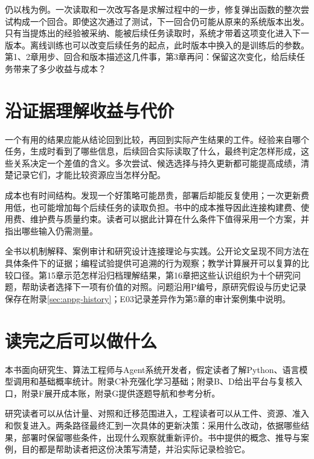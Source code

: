 仍以栈为例。一次读取和一次改写各是求解过程中的一步，修复弹出函数的整次尝试构成一个回合。即使这次通过了测试，下一回合仍可能从原来的系统版本出发。只有当提炼出的经验被采纳、能被后续任务读取时，系统才带着这项变化进入下一版本。离线训练也可以改变后续任务的起点，此时版本中换入的是训练后的参数。第1、2章用步、回合和版本描述这几件事，第3章再问：保留这次变化，给后续任务带来了多少收益与成本？

\section*{沿证据理解收益与代价}

一个有用的结果应能从结论回到比较，再回到实际产生结果的工件。经验来自哪个任务，生成时看到了哪些信息，后续回合实际读取了什么，最终判定怎样形成，这些关系决定一个差值的含义。多次尝试、候选选择与持久更新都可能提高成绩，清楚记录它们，才能比较资源应当怎样分配。

成本也有时间结构。发现一个好策略可能昂贵，部署后却能反复使用；一次更新费用低，也可能增加每个后续任务的读取负担。书中的成本推导因此连接构建费、使用费、维护费与质量约束。读者可以据此计算在什么条件下值得采用一个方案，并指出哪些输入仍需测量。

全书以机制解释、案例审计和研究设计连接理论与实践。公开论文呈现不同方法在具体条件下的证据；编程试验提供可追溯的行为观察；教学计算展开可以复算的比较口径。第15章示范怎样沿归档理解结果，第16章把这些认识组织为十个研究问题，帮助读者选择下一项有价值的对照。问题沿用P编号，原研究假设与历史记录保存在附录\ref{sec:appg-history}；E03记录差异作为第5章的审计案例集中说明。

\section*{读完之后可以做什么}

本书面向研究生、算法工程师与Agent系统开发者，假定读者了解Python、语言模型调用和基础概率统计。附录C补充强化学习基础；附录B、D给出平台与复核入口，附录F展开成本账，附录G提供逐题导航和参考分析。

研究读者可以从估计量、对照和迁移范围进入，工程读者可以从工件、资源、准入和恢复进入。两条路径最终汇到一次具体的更新决策：采用什么改动，依据哪些结果，部署时保留哪些条件，出现什么观察就重新评价。书中提供的概念、推导与案例，目的都是帮助读者把这份决策写清楚，并沿实际记录检验它。
